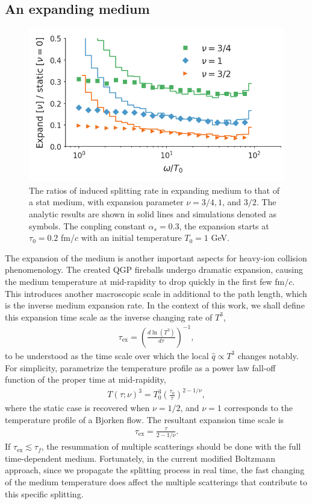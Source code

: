 \documentclass[aps, prc, reprint, amsmath, groupedaddress, nofootinbib]{revtex4-1}
\begin{document}
\subsection{An expanding medium}
\begin{figure}
\includegraphics[width=\columnwidth]{spectrum_Bjorken.png}
\caption{The ratios of induced splitting rate in expanding medium to that of a stat medium, with expansion parameter $\nu = 3/4, 1$, and $3/2$. The analytic results are shown in solid lines and simulations denoted as symbols. The conpling constant $\alpha_s=0.3$, the expansion starts at $\tau_0 = 0.2$ fm/$c$ with an initial temperature $T_0 = 1$ GeV.}
\label{fig:Bjorken-BDMPS}
\end{figure}

The expansion of the medium is another important aspects for heavy-ion collision phenomenology.
The created QGP fireballs undergo dramatic expansion, causing the medium temperature at mid-rapidity to drop quickly in the first few fm$/c$.
This introduces another macroscopic scale in additional to the path length, which is the inverse medium expansion rate. 
In the context of this work, we shall define this expansion time scale as the inverse changing rate of $T^3$,
\begin{eqnarray}
\tau_{\textrm{ex}} = \left(\frac{d\ln(T^3)}{d \tau} \right)^{-1},
\end{eqnarray}
to be understood as the time scale over which the local $\hat{q}\propto T^3$ changes notably.
For simplicity, parametrize the temperature profile as a power law fall-off function of the proper time at mid-rapidity,
\begin{eqnarray}
T(\tau; \nu)^3 = T_0^3\left(\frac{\tau_0}{\tau}\right)^{2-1/\nu},
\label{eq:temperature}
\end{eqnarray}
where the static case is recovered when $\nu=1/2$, and $\nu=1$ corresponds to the temperature profile of a Bjorken flow.
The resultant expansion time scale is
\begin{eqnarray}
\tau_{\textrm{ex}} = \frac{\tau}{2-1/\nu}.
\end{eqnarray}
If $\tau_{\textrm{ex}} \lesssim \tau_f$, the resummation of multiple scatterings should be done with the full time-dependent medium.
Fortunately, in the current modified Boltzmann approach, since we propagate the splitting process in real time, the fast changing of the medium temperature does affect the multiple scatterings that contribute to this specific splitting.
\end{document}
